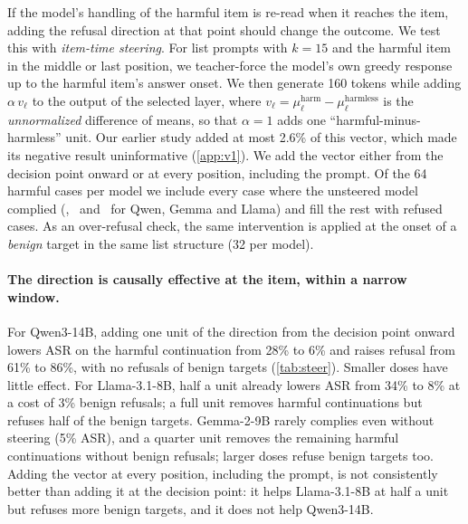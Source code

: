 If the model's handling of the harmful item is re-read when it reaches the item, adding the refusal direction at
that point should change the outcome. We test this with \emph{item-time steering}. For list prompts with
$k{=}15$ and the harmful item in the middle or last position, we teacher-force the model's own greedy response
up to the harmful item's answer onset. We then generate 160 tokens while adding $\alpha\,v_\ell$ to the output of
the selected layer, where $v_\ell=\mu^{\text{harm}}_\ell-\mu^{\text{harmless}}_\ell$ is the \emph{unnormalized}
difference of means, so that $\alpha{=}1$ adds one ``harmful-minus-harmless'' unit. Our earlier study added at
most 2.6\% of this vector, which made its negative result uninformative (\cref{app:v1}). We add the vector either
from the decision point onward or at every position, including the prompt. Of the 64 harmful cases per model we include every case where
the unsteered model complied (\QwenSteerNComply, \GemmaSteerNComply\ and \LlamaSteerNComply\ for Qwen, Gemma and
Llama) and fill the rest with refused cases. As an over-refusal check, the same
intervention is applied at the onset of a \emph{benign} target in the same list structure (32 per model).

\begin{table}[t]
\centering\small
\caption{Item-time steering at $k{=}15$. Harmful targets: HarmBench ASR / target refused (\%), scored on the
160-token continuation. Benign targets: refused (\%). $\alpha$ is in units of the unnormalized
difference-of-means vector at the selected layer.}
\label{tab:steer}
\resizebox{\linewidth}{!}{}
\end{table}

\paragraph{The direction is causally effective at the item, within a narrow window.} For Qwen3-14B, adding one
unit of the direction from the decision point onward lowers ASR on the harmful continuation from 28\% to 6\% and
raises refusal from 61\% to 86\%, with no refusals of benign targets (\cref{tab:steer}). Smaller doses have
little effect. For Llama-3.1-8B, half a unit already lowers ASR from 34\% to 8\% at a cost of 3\% benign
refusals; a full unit removes harmful continuations but refuses half of the benign targets. Gemma-2-9B rarely
complies even without steering (5\% ASR), and a quarter unit removes the remaining harmful continuations without
benign refusals; larger doses refuse benign targets too. Adding the vector at every position, including the
prompt, is not consistently better than adding it at the decision point: it helps Llama-3.1-8B at half a unit but
refuses more benign targets, and it does not help Qwen3-14B.

